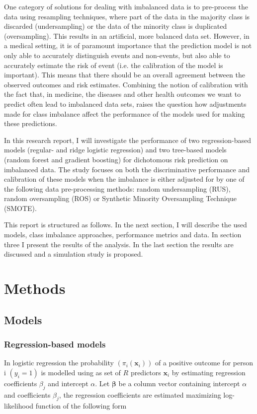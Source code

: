 \documentclass[AMA,STIX1COL, table]{WileyNJD-v2}
\begin{document}
One category of solutions for dealing with imbalanced data is to pre-process the data using resampling techniques, where part of the data in the majority class is discarded (undersampling) or the data of the minority class is duplicated (oversampling). This results in an artificial, more balanced data set. \cite{He&Garcia2009}\cite{Fernandez2018} However, in a medical setting, it is of paramount importance that the prediction model is not only able to accurately distinguish events and non-events, but also able to accurately estimate the risk of event (i.e. the calibration of the model is important). This means that there should be an overall agreement between the observed outcomes and risk estimates.\cite{Steyerberg2009} Combining the notion of calibration with the fact that, in medicine, the diseases and other health outcomes we want to predict often lead to imbalanced data sets, raises the question how adjustments made for class imbalance affect the performance of the models used for making these predictions.

In this research report, I will investigate the performance of two regression-based models (regular- and ridge logistic regression) and two tree-based models (random forest and gradient boosting) for dichotomous risk prediction on imbalanced data. The study focuses on both the discriminative performance and calibration of these models when the imbalance is either adjusted for by one of the following data pre-processing methods: random undersampling (RUS), random oversampling (ROS) or Synthetic Minority Oversampling Technique (SMOTE). \cite{Smote2018}


This report is structured as follows. In the next section, I will describe the used models, class imbalance approaches, performance metrics and data. In section three I present the results of the analysis. In the last section the results are discussed and a simulation study is proposed.  

\section{Methods}

\subsection{Models} \label{models}
\subsubsection{Regression-based models}
In logistic regression the probability $(\pi_i(\mathbf x_i))$ of a positive outcome for person i $(y_i=1)$ is modelled using as set of $R$ predictors $\mathbf x_i$ by estimating regression coefficients $\beta_j$ and intercept $\alpha$. Let $\mathbf{\beta}$ be a column vector containing intercept $\alpha$ and coefficients $\beta_j$, the regression coefficients are estimated maximizing log-likelihood function of the following form
\end{document}
